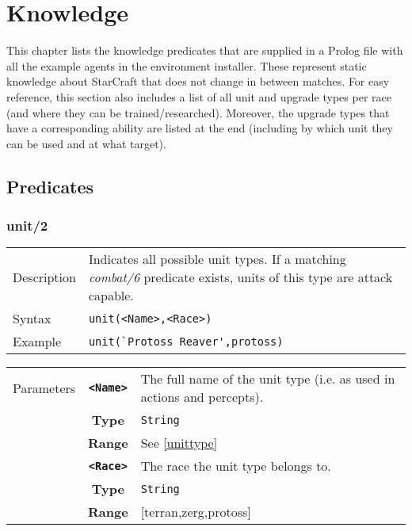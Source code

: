 \chapter{Knowledge}

This chapter lists the knowledge predicates that are supplied in a Prolog file with all the example agents in the environment installer. These represent static knowledge about StarCraft that does not change in between matches. For easy reference, this section also includes a list of all unit and upgrade types per race (and where they can be trained/researched). Moreover, the upgrade types that have a corresponding ability are listed at the end (including by which unit they can be used and at what target).

\section{Predicates}
\subsection{unit/2}
\begin{tabularx}{\textwidth}{lX}
 Description & Indicates all possible unit types. If a matching \textit{combat/6} predicate exists, units of this type are attack capable. \\
 Syntax & \verb|unit(<Name>,<Race>)| \\
 Example & \verb|unit(`Protoss Reaver',protoss)| \\
 \end{tabularx}
 \begin{tabularx}{\textwidth}{l | c | p{8cm}|}
 \cline{2-3}
 Parameters & \textbf{\verb|<Name>|} & The full name of the unit type (i.e. as used in actions and percepts). \\
            & \textbf{Type} & \verb|String| \\
            & \textbf{Range} & See \ref{unittype} \\
            \cline{2-3}
 			& \textbf{\verb|<Race>|} & The race the unit type belongs to.\\
            & \textbf{Type} & \verb|String| \\
            & \textbf{Range} & [terran,zerg,protoss] \\
            \cline{2-3}
\end{tabularx}

